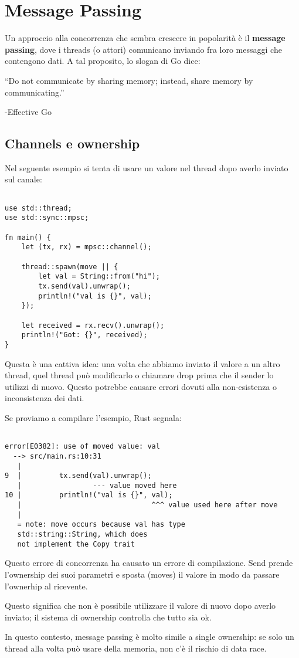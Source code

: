 \newpage
\section{Message Passing}

Un approccio alla concorrenza che sembra crescere in popolarità è il
\textbf{message passing}, dove i threads (o attori) comunicano inviando fra loro
messaggi che contengono dati.
A tal proposito, lo slogan di Go dice:

``Do not communicate by sharing memory; instead, share memory by
communicating.''

-Effective Go

\subsection{Channels e ownership}

Nel seguente esempio si tenta di usare un valore nel thread dopo averlo inviato
sul canale:

\begin{lstlisting}

use std::thread;
use std::sync::mpsc;

fn main() {
    let (tx, rx) = mpsc::channel();

    thread::spawn(move || {
        let val = String::from("hi");
        tx.send(val).unwrap();
        println!("val is {}", val);
    });

    let received = rx.recv().unwrap();
    println!("Got: {}", received);
}
\end{lstlisting}

Questa è una cattiva idea: una volta che abbiamo inviato il valore a un altro
thread, quel thread può modificarlo o chiamare drop prima che il sender
lo utilizzi di nuovo. Questo potrebbe causare errori dovuti alla non-esistenza
o inconsistenza dei dati.

Se proviamo a compilare l'esempio, Rust segnala:


\begin{lstlisting}

error[E0382]: use of moved value: val
  --> src/main.rs:10:31
   |
9  |         tx.send(val).unwrap();
   |                 --- value moved here
10 |         println!("val is {}", val);
   |                               ^^^ value used here after move
   |
   = note: move occurs because val has type
   std::string::String, which does
   not implement the Copy trait

\end{lstlisting}

Questo errore di concorrenza ha causato un errore di compilazione.
Send prende l'ownership dei suoi parametri e sposta (moves) il valore
in modo da passare l'ownerhip al ricevente.

Questo significa che non è possibile utilizzare il valore di nuovo dopo averlo
inviato; il sistema di ownership controlla che tutto sia ok.

In questo contesto, message passing è molto simile a single ownership: se solo
un thread alla volta può usare della memoria, non c'è il rischio di data race.
